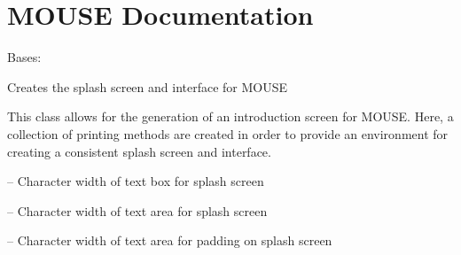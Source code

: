 \documentclass[letterpaper,10pt,english]{sphinxmanual}
\begin{document}
\section{MOUSE Documentation}
\label{\detokenize{MouseReferenceManual:mouse-documentation}}\label{\detokenize{MouseReferenceManual:module-MOUSE}}

\begin{fulllineitems}
\label{\detokenize{MouseReferenceManual:MOUSE.SplashScreen}}
Bases: 

Creates the splash screen and interface for MOUSE

This class allows for the generation of an introduction screen for MOUSE. Here, a collection of printing methods are created in order to provide an environment for creating a consistent splash screen and interface.

\begin{fulllineitems}
\label{\detokenize{MouseReferenceManual:MOUSE.SplashScreen.boxWidth}}
 -- Character width of text box for splash screen

\end{fulllineitems}


\begin{fulllineitems}
\label{\detokenize{MouseReferenceManual:MOUSE.SplashScreen.textWidth}}
 -- Character width of text area for splash screen

\end{fulllineitems}


\begin{fulllineitems}
\label{\detokenize{MouseReferenceManual:MOUSE.SplashScreen.padWidth}}
 -- Character width of text area for padding on splash screen

\end{fulllineitems}



\end{fulllineitems}
\end{document}
